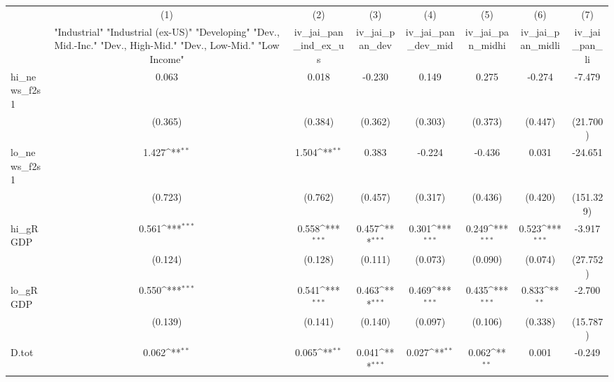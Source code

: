 {
\def\sym#1{\ifmmode^{#1}\else\(^{#1}\)\fi}
\begin{tabular}{l*{7}{c}}
\toprule
            &\multicolumn{1}{c}{(1)}&\multicolumn{1}{c}{(2)}&\multicolumn{1}{c}{(3)}&\multicolumn{1}{c}{(4)}&\multicolumn{1}{c}{(5)}&\multicolumn{1}{c}{(6)}&\multicolumn{1}{c}{(7)}\\
            &\multicolumn{1}{c}{ "Industrial" "Industrial (ex-US)" "Developing" "Dev., Mid.-Inc." "Dev., High-Mid."  "Dev., Low-Mid." "Low Income" }&\multicolumn{1}{c}{iv\_jai\_pan\_ind\_ex\_us}&\multicolumn{1}{c}{iv\_jai\_pan\_dev}&\multicolumn{1}{c}{iv\_jai\_pan\_dev\_mid}&\multicolumn{1}{c}{iv\_jai\_pan\_midhi}&\multicolumn{1}{c}{iv\_jai\_pan\_midli}&\multicolumn{1}{c}{iv\_jai\_pan\_li}\\
\midrule
hi\_news\_f2s1&       0.063         &       0.018         &      -0.230         &       0.149         &       0.275         &      -0.274         &      -7.479         \\
            &     (0.365)         &     (0.384)         &     (0.362)         &     (0.303)         &     (0.373)         &     (0.447)         &    (21.700)         \\
\addlinespace
lo\_news\_f2s1&       1.427\sym{**} &       1.504\sym{**} &       0.383         &      -0.224         &      -0.436         &       0.031         &     -24.651         \\
            &     (0.723)         &     (0.762)         &     (0.457)         &     (0.317)         &     (0.436)         &     (0.420)         &   (151.329)         \\
\addlinespace
hi\_gRGDP    &       0.561\sym{***}&       0.558\sym{***}&       0.457\sym{***}&       0.301\sym{***}&       0.249\sym{***}&       0.523\sym{***}&      -3.917         \\
            &     (0.124)         &     (0.128)         &     (0.111)         &     (0.073)         &     (0.090)         &     (0.074)         &    (27.752)         \\
\addlinespace
lo\_gRGDP    &       0.550\sym{***}&       0.541\sym{***}&       0.463\sym{***}&       0.469\sym{***}&       0.435\sym{***}&       0.833\sym{**} &      -2.700         \\
            &     (0.139)         &     (0.141)         &     (0.140)         &     (0.097)         &     (0.106)         &     (0.338)         &    (15.787)         \\
\addlinespace
D.tot       &       0.062\sym{**} &       0.065\sym{**} &       0.041\sym{***}&       0.027\sym{**} &       0.062\sym{**} &       0.001         &      -0.249         \\

\end{tabular}}
